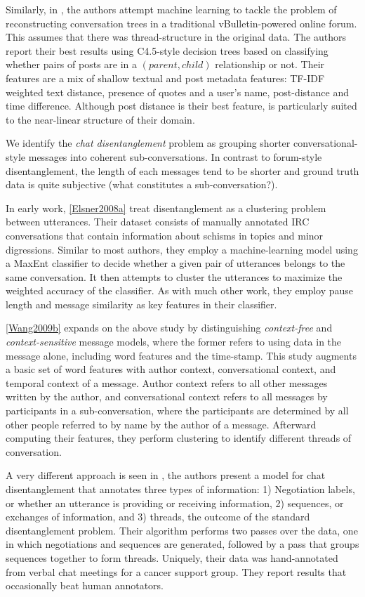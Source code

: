 \documentclass{article}
\begin{document}
Similarly, in \cite{Aumayr2011a}, the authors attempt machine learning to 
tackle the problem of reconstructing conversation trees in a traditional
vBulletin-powered online forum. This assumes that there was thread-structure 
in the original data. The authors report their best results using C4.5-style
decision trees based on classifying whether pairs of posts are in a $(parent, child)$
relationship or not. Their features are a mix of shallow textual and post 
metadata features: TF-IDF weighted text distance, 
presence of quotes and a user's name, post-distance and time difference. 
Although post distance is their best feature, is particularly suited to the 
near-linear structure of their domain.

We identify the \textit{chat disentanglement} problem as grouping
shorter conversational-style messages into coherent sub-conversations.
In contrast to forum-style disentanglement, the length of each messages tend to be shorter
and ground truth data is quite subjective (what constitutes a sub-conversation?).

In early work, \ref{Elsner2008a} treat disentanglement as a clustering problem between 
utterances. Their dataset consists of manually annotated IRC conversations that contain
information about schisms in topics and minor digressions. Similar to most authors, 
they employ a machine-learning model using a MaxEnt classifier to decide whether a given pair of
utterances belongs to the same conversation. It then attempts to cluster the
utterances to maximize the weighted accuracy of the classifier. As with much other
work, they employ pause length and message similarity as key features in
their classifier.

\ref{Wang2009b} expands on the above study by distinguishing
\textit{context-free} and \textit{context-sensitive} message models, where the 
former refers to using data in the message alone, including word features and the
time-stamp.  This study augments a basic set of word features with author context, 
conversational context, and temporal context of a message. Author context 
refers to all other messages written by the author, and conversational context 
refers to all messages by participants in a sub-conversation, 
where the participants are determined by all other people referred to by name 
by the author of a message.  Afterward computing their features, they perform
clustering to identify different threads of conversation.

A very different approach is seen in \cite{Mayfield2012a}, the authors present
a model for chat disentanglement that annotates three types of information: 1) 
Negotiation labels, or whether an utterance is providing or receiving 
information, 2) sequences, or exchanges of information, and 3) threads, the 
outcome of the standard disentanglement problem. Their algorithm performs 
two passes over the data,  one in which negotiations and sequences are generated, 
followed by a pass that groups sequences together to form threads. Uniquely,
their data was hand-annotated from verbal chat meetings for a cancer support group.
They report results that occasionally beat human annotators.
\end{document}
